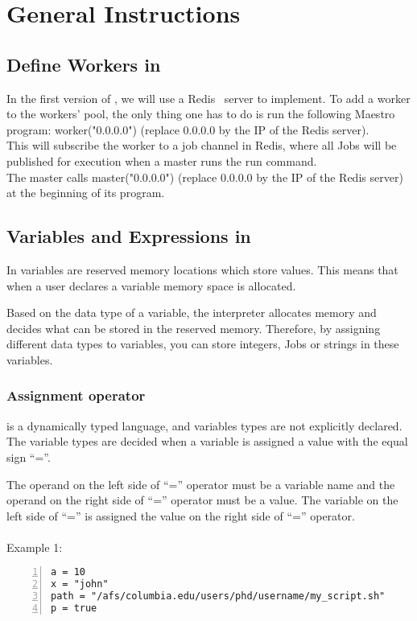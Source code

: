 \section{General Instructions}
\label{sect:general}

\subsection*{Define Workers in \lang{}}
In the first version of \lang{}, we will use a Redis~\cite{redis} server to
implement. To add a worker to the workers' pool, the only thing one has to do
is run the following Maestro program: worker("0.0.0.0") (replace 0.0.0.0 by
the IP of the Redis server).\\
This will subscribe the worker to a job channel in Redis, where all Jobs will
be published for execution when a master runs the run command.\\
The master calls master("0.0.0.0") (replace 0.0.0.0 by the IP of the Redis server)
at the beginning of its program.

\subsection*{Variables and Expressions in \lang{}}
In \lang{} variables are reserved memory locations which store values. This means that when a user declares a variable
memory space is allocated.

Based on the data type of a variable, the interpreter allocates memory and decides what can be stored in the reserved memory.
Therefore, by assigning different data types to variables, you can store integers, Jobs or strings in these variables.

\subsubsection*{Assignment operator}
\lang{}  is a dynamically typed language, and variables types are not explicitly declared.
The variable types are decided when a variable is assigned a value with the equal sign ``=''.

The operand on the left side of ``='' operator must be a variable name and the operand on the right side of ``='' operator must be a value.
The variable on the left side of ``='' is assigned the value on the right side of ``='' operator.\\
\\
Example 1:
\begin{Verbatim}[numbers=left]
a = 10
x = "john"
path = "/afs/columbia.edu/users/phd/username/my_script.sh"
p = true
\end{Verbatim}

